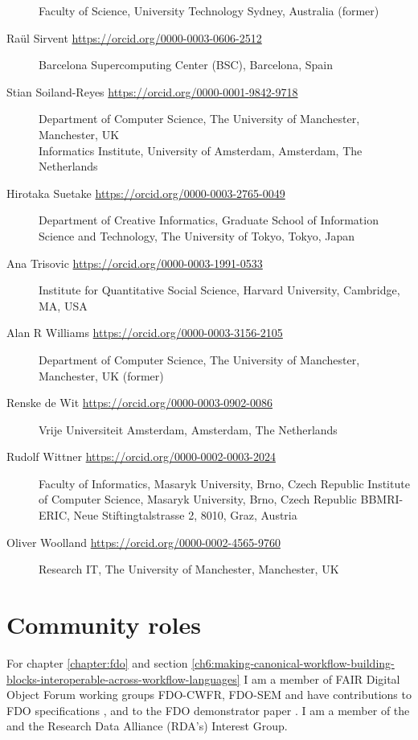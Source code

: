 \begin{flushleft}
\begin{description}
Faculty of Science, University Technology Sydney, Australia (former)
\item[Raül Sirvent \url{https://orcid.org/0000-0003-0606-2512}]
Barcelona Supercomputing Center (BSC), Barcelona, Spain
\item[Stian Soiland-Reyes \url{https://orcid.org/0000-0001-9842-9718}]
Department of Computer Science, The University of Manchester,
Manchester, UK\\
Informatics Institute, University of Amsterdam, Amsterdam, The
Netherlands
\item[Hirotaka Suetake \url{https://orcid.org/0000-0003-2765-0049}]
Department of Creative Informatics, Graduate School of Information Science and Technology, The University of Tokyo, Tokyo, Japan
\item[Ana Trisovic \url{https://orcid.org/0000-0003-1991-0533}]
Institute for Quantitative Social Science, Harvard University,
Cambridge, MA, USA
\item[Alan R Williams \url{https://orcid.org/0000-0003-3156-2105}] 
Department of Computer Science, The University of Manchester,
Manchester, UK (former)
\item[Renske de Wit \url{https://orcid.org/0000-0003-0902-0086}]
Vrije Universiteit Amsterdam, Amsterdam, The Netherlands

\item[Rudolf Wittner \url{https://orcid.org/0000-0002-0003-2024}]
Faculty of Informatics, Masaryk University, Brno, Czech Republic
Institute of Computer Science, Masaryk University, Brno, Czech Republic
BBMRI-ERIC, Neue Stiftingtalstrasse 2, 8010, Graz, Austria
\item[Oliver Woolland \url{https://orcid.org/0000-0002-4565-9760}]
Research IT, The University of Manchester, Manchester, UK


\end{description}\end{flushleft}


\section{Community roles}

For chapter \ref{chapter:fdo} and section \ref{ch6:making-canonical-workflow-building-blocks-interoperable-across-workflow-languages} I am a member of FAIR Digital Object Forum \cite{FAIRDigitalObjects} working groups FDO-CWFR, FDO-SEM and have contributions to FDO specifications \cite{Anders 2023,Ivonne 2023}, and to the FDO demonstrator paper \cite{Wittenburg 2022a}. I am a member of the  and the Research Data Alliance (RDA's)  Interest Group.

